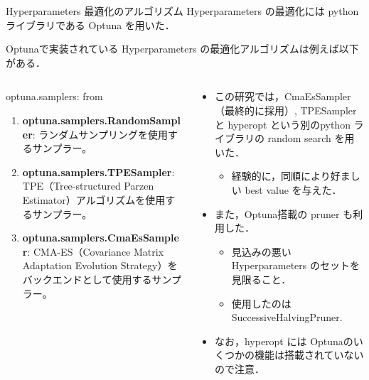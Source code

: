 \begin{frame}{Hyperparameters 最適化のアルゴリズム}
    Hyperparameters の最適化には python ライブラリである Optuna を用いた．
     
    Optunaで実装されている Hyperparameters の最適化アルゴリズムは例えば以下がある．
    \begin{columns}[T] %
        \begin{column}{.5\textwidth}
            

            \begin{block}{optuna.samplers: from \cite{optuna_doc}}
                \begin{enumerate}
                    \item \textbf{optuna.samplers.RandomSampler}: ランダムサンプリングを使用するサンプラー。
                    \item \textbf{optuna.samplers.TPESampler}: TPE（Tree-structured Parzen Estimator）アルゴリズムを使用するサンプラー。
                    \item \textbf{optuna.samplers.CmaEsSampler}: CMA-ES（Covariance Matrix Adaptation Evolution Strategy）をバックエンドとして使用するサンプラー。
                \end{enumerate}
                
            \end{block}
        
        \end{column}
        \begin{column}{.5\textwidth}
            \begin{itemize}
                \item この研究では，CmaEsSampler （最終的に採用）, TPESampler と hyperopt という別のpython ライブラリの random search を用いた．\begin{itemize}
                    \item 経験的に，同順により好ましい best value を与えた．
                    
                \end{itemize}
                \item また，Optuna搭載の pruner も利用した．\begin{itemize}
                    \item 見込みの悪い Hyperparameters のセットを見限ること．
                    \item 使用したのは SuccessiveHalvingPruner.
                \end{itemize}
                \item なお，hyperopt には Optunaのいくつかの機能は搭載されていないので注意．
            \end{itemize}
        \end{column}
      \end{columns}


\end{frame}


